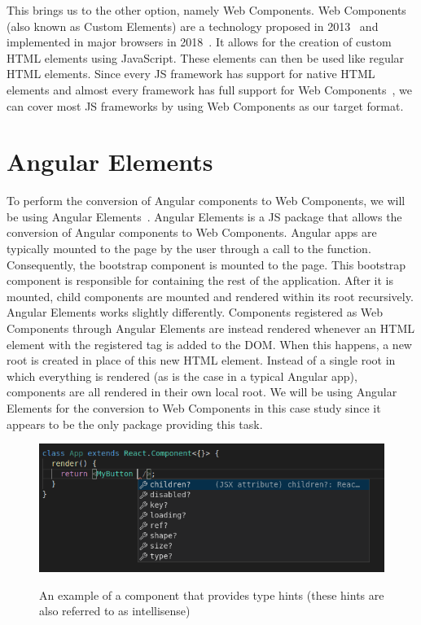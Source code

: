 This brings us to the other option, namely Web Components. Web Components (also known as Custom Elements) are a technology proposed in 2013~ and implemented in major browsers in 2018~. It allows for the creation of custom HTML elements using JavaScript. These elements can then be used like regular HTML elements. Since every JS framework has support for native HTML elements and almost every framework has full support for Web Components~, we can cover most JS frameworks by using Web Components as our target format.

\section{Angular Elements}\label{sec:bg:angularelements}
To perform the conversion of Angular components to Web Components, we will be using Angular Elements~. Angular Elements is a JS package that allows the conversion of Angular components to Web Components. Angular apps are typically mounted to the page by the user through a call to the  function. Consequently, the bootstrap component is mounted to the page. This bootstrap component is responsible for containing the rest of the application. After it is mounted, child components are mounted and rendered within its root recursively. Angular Elements works slightly differently. Components registered as Web Components through Angular Elements are instead rendered whenever an HTML element with the registered tag is added to the DOM\@. When this happens, a new root is created in place of this new HTML element. Instead of a single root in which everything is rendered (as is the case in a typical Angular app), components are all rendered in their own local root. We will be using Angular Elements for the conversion to Web Components in this case study since it appears to be the only package providing this task.

\begin{figure}[h]
  \caption{An example of a component that provides type hints (these hints are also referred to as intellisense)}
  \includegraphics[width=\columnwidth]{figures/background/hinting.png}
  \label{fig:bg:hinting}
  \centering
\end{figure}

